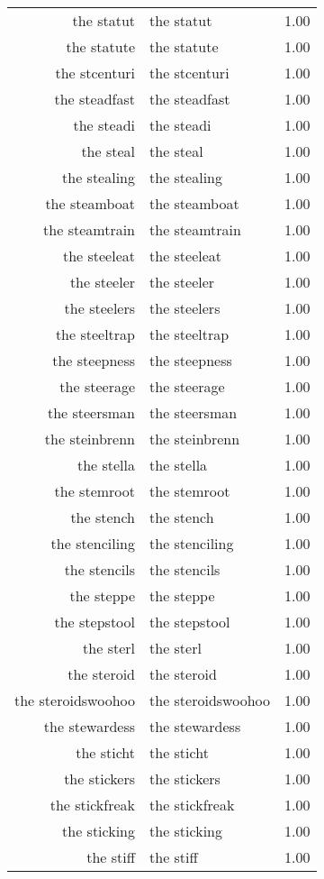 \begin{table}[ht]
\begin{tabular}{rlr}
  the statut & the statut & 1.00 \\ 
  the statute & the statute & 1.00 \\ 
  the stcenturi & the stcenturi & 1.00 \\ 
  the steadfast & the steadfast & 1.00 \\ 
  the steadi & the steadi & 1.00 \\ 
  the steal & the steal & 1.00 \\ 
  the stealing & the stealing & 1.00 \\ 
  the steamboat & the steamboat & 1.00 \\ 
  the steamtrain & the steamtrain & 1.00 \\ 
  the steeleat & the steeleat & 1.00 \\ 
  the steeler & the steeler & 1.00 \\ 
  the steelers & the steelers & 1.00 \\ 
  the steeltrap & the steeltrap & 1.00 \\ 
  the steepness & the steepness & 1.00 \\ 
  the steerage & the steerage & 1.00 \\ 
  the steersman & the steersman & 1.00 \\ 
  the steinbrenn & the steinbrenn & 1.00 \\ 
  the stella & the stella & 1.00 \\ 
  the stemroot & the stemroot & 1.00 \\ 
  the stench & the stench & 1.00 \\ 
  the stenciling & the stenciling & 1.00 \\ 
  the stencils & the stencils & 1.00 \\ 
  the steppe & the steppe & 1.00 \\ 
  the stepstool & the stepstool & 1.00 \\ 
  the sterl & the sterl & 1.00 \\ 
  the steroid & the steroid & 1.00 \\ 
  the steroidswoohoo & the steroidswoohoo & 1.00 \\ 
  the stewardess & the stewardess & 1.00 \\ 
  the sticht & the sticht & 1.00 \\ 
  the stickers & the stickers & 1.00 \\ 
  the stickfreak & the stickfreak & 1.00 \\ 
  the sticking & the sticking & 1.00 \\ 
  the stiff & the stiff & 1.00 \\ 

\end{tabular}
\end{table}
